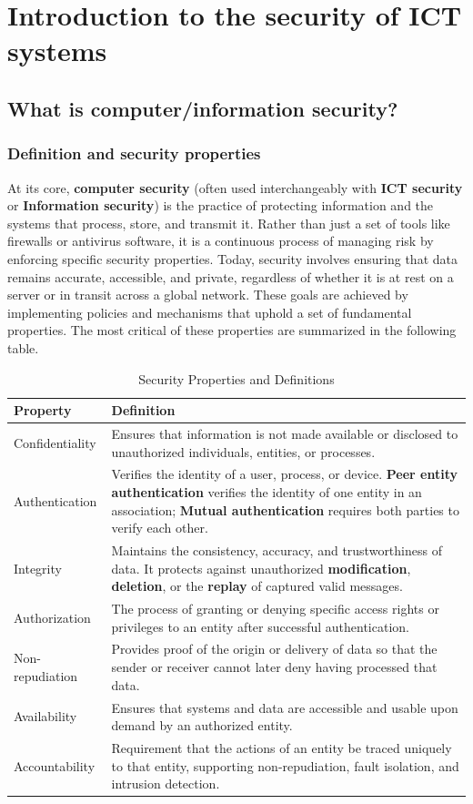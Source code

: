 \chapter[]{Introduction to the security of ICT systems}

\section{What is computer/information
security?}
\subsection{Definition and security properties}
At its core, \textbf{computer security} (often used interchangeably with \textbf{ICT security} or \textbf{Information security}) is the practice of protecting information and the systems that process, store, and transmit it. Rather than just a set of tools like firewalls or antivirus software, it is a continuous process of managing risk by enforcing specific security properties.
Today, security involves ensuring that data remains accurate, accessible, and private, regardless of whether it is at rest on a server or in transit across a global network. These goals are achieved by implementing policies and mechanisms that uphold a set of fundamental properties.
The most critical of these properties are summarized in the following table.
\begin{table}[h!]
\centering
\caption{Security Properties and Definitions}
\label{tab:security_properties}
\begin{tabular}{|l|p{10cm}|}
\hline
\textbf{Property} & \textbf{Definition} \\ \hline
Confidentiality & Ensures that information is not made available or disclosed to unauthorized individuals, entities, or processes. \\ \hline
Authentication & Verifies the identity of a user, process, or device. \textbf{Peer entity authentication} verifies the identity of one entity in an association; \textbf{Mutual authentication} requires both parties to verify each other. \\ \hline
Integrity & Maintains the consistency, accuracy, and trustworthiness of data. It protects against unauthorized \textbf{modification}, \textbf{deletion}, or the \textbf{replay} of captured valid messages. \\ \hline
Authorization & The process of granting or denying specific access rights or privileges to an entity after successful authentication. \\ \hline
Non-repudiation & Provides proof of the origin or delivery of data so that the sender or receiver cannot later deny having processed that data. \\ \hline
Availability & Ensures that systems and data are accessible and usable upon demand by an authorized entity. \\ \hline
Accountability & Requirement that the actions of an entity be traced uniquely to that entity, supporting non-repudiation, fault isolation, and intrusion detection. \\ \hline
\end{tabular}
\end{table}
\clearpage

